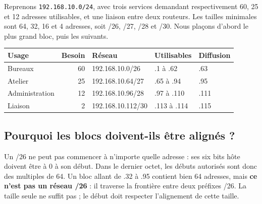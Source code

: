 \documentclass[11pt,a4paper]{article}
\newcommand{\ip}[1]{\textcolor{ipred}{\texttt{#1}}}
\begin{document}
Reprenons \ip{192.168.10.0/24}, avec trois services demandant respectivement
60, 25 et 12 adresses utilisables, et une liaison entre deux routeurs.
Les tailles minimales sont 64, 32, 16 et 4 adresses, soit /26, /27, /28 et /30.
Nous plaçons d'abord le plus grand bloc, puis les suivants.
\begin{center}\small
\begin{tabular}{@{}lrl ll@{}}
\toprule
Usage & Besoin & Réseau & Utilisables & Diffusion\\
\midrule
Bureaux & 60 & 192.168.10.0/26 & .1 à .62 & .63\\
Atelier & 25 & 192.168.10.64/27 & .65 à .94 & .95\\
Administration & 12 & 192.168.10.96/28 & .97 à .110 & .111\\
Liaison & 2 & 192.168.10.112/30 & .113 à .114 & .115\\
\bottomrule
\end{tabular}
\end{center}
\begin{center}
\end{center}

\Needspace{4cm}
\subsection*{Pourquoi les blocs doivent-ils être alignés ?}
Un /26 ne peut pas commencer à n'importe quelle adresse : ses six bits hôte doivent être à 0
à son début. Dans le dernier octet, les débuts autorisés sont donc des multiples de 64.
Un bloc allant de .32 à .95 contient bien 64 adresses, mais \textbf{ce n'est pas un réseau /26} :
il traverse la frontière entre deux préfixes /26.
La taille seule ne suffit pas ; le début doit respecter l'alignement de cette taille.
\end{document}
